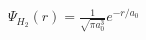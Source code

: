 \documentclass[preview]{standalone}
\begin{document}
\begin{center}
$\Psi_{H_2}(r) = \frac{1}{\sqrt{\pi a_0^3}} e^{-r/a_0} $
\end{center}
\end{document}
